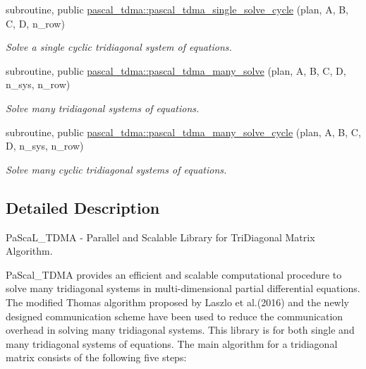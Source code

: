 \begin{DoxyCompactItemize}
subroutine, public \mbox{\hyperlink{namespacepascal__tdma_ac8e377fa86c75126380f0196f6046043}{pascal\+\_\+tdma\+::pascal\+\_\+tdma\+\_\+single\+\_\+solve\+\_\+cycle}} (plan, A, B, C, D, n\+\_\+row)
\begin{DoxyCompactList}\small\item\em Solve a single cyclic tridiagonal system of equations. \end{DoxyCompactList}\item 
subroutine, public \mbox{\hyperlink{namespacepascal__tdma_afa0c78b8377f5fe1059907befda3c940}{pascal\+\_\+tdma\+::pascal\+\_\+tdma\+\_\+many\+\_\+solve}} (plan, A, B, C, D, n\+\_\+sys, n\+\_\+row)
\begin{DoxyCompactList}\small\item\em Solve many tridiagonal systems of equations. \end{DoxyCompactList}\item 
subroutine, public \mbox{\hyperlink{namespacepascal__tdma_acbaed65e67ecbfd92a8f1d51d1b69fd5}{pascal\+\_\+tdma\+::pascal\+\_\+tdma\+\_\+many\+\_\+solve\+\_\+cycle}} (plan, A, B, C, D, n\+\_\+sys, n\+\_\+row)
\begin{DoxyCompactList}\small\item\em Solve many cyclic tridiagonal systems of equations. \end{DoxyCompactList}\end{DoxyCompactItemize}


\subsection{Detailed Description}
Pa\+Sca\+L\+\_\+\+T\+D\+MA -\/ Parallel and Scalable Library for Tri\+Diagonal Matrix Algorithm. 

Pa\+Scal\+\_\+\+T\+D\+MA provides an efficient and scalable computational procedure to solve many tridiagonal systems in multi-\/dimensional partial differential equations. The modified Thomas algorithm proposed by Laszlo et al.(2016) and the newly designed communication scheme have been used to reduce the communication overhead in solving many tridiagonal systems. This library is for both single and many tridiagonal systems of equations. The main algorithm for a tridiagonal matrix consists of the following five steps\+:

